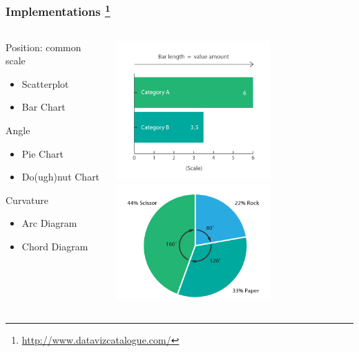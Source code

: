 \begin{frame}
  \frametitle{Implementations
  \footnote{\tiny{\href{http://www.datavizcatalogue.com/}{http://www.datavizcatalogue.com/}}}
  }
  \begin{columns}[T]
    \begin{column}{6cm}  
      \begin{alertblock}{Position: common scale}
        \begin{itemize}
          \item Scatterplot
          \item Bar Chart
        \end{itemize}
      \end{alertblock}
      \begin{block}{Angle}
        \begin{itemize}
          \item Pie Chart
          \item Do(ugh)nut Chart
        \end{itemize}  
      \end{block}
      \begin{alertblock}{Curvature}
        \begin{itemize}
          \item Arc Diagram
          \item Chord Diagram
        \end{itemize}
      \end{alertblock}
      \end{column}
    \begin{column}{4cm}  
      \includegraphics[width=0.65\textwidth]{images/bar_chart} \\
      \includegraphics[width=0.65\textwidth]{images/pie_chart} \\

\end{column}
\end{columns}
\end{frame}
